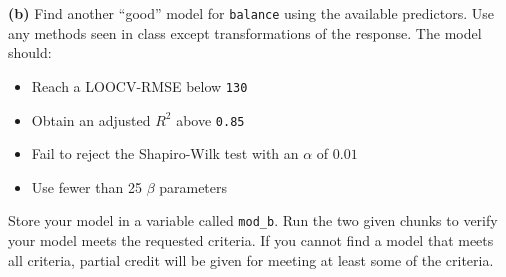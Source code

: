 \documentclass[
]{article}
\providecommand{\tightlist}{%
  \setlength{\itemsep}{0pt}\setlength{\parskip}{0pt}}
\begin{document}
\textbf{(b)} Find another ``good'' model for \texttt{balance} using the
available predictors. Use any methods seen in class except
transformations of the response. The model should:

\begin{itemize}
\tightlist
\item
  Reach a LOOCV-RMSE below \texttt{130}
\item
  Obtain an adjusted \(R^2\) above \texttt{0.85}
\item
  Fail to reject the Shapiro-Wilk test with an \(\alpha\) of \(0.01\)
\item
  Use fewer than 25 \(\beta\) parameters
\end{itemize}

Store your model in a variable called \texttt{mod\_b}. Run the two given
chunks to verify your model meets the requested criteria. If you cannot
find a model that meets all criteria, partial credit will be given for
meeting at least some of the criteria.
\end{document}
